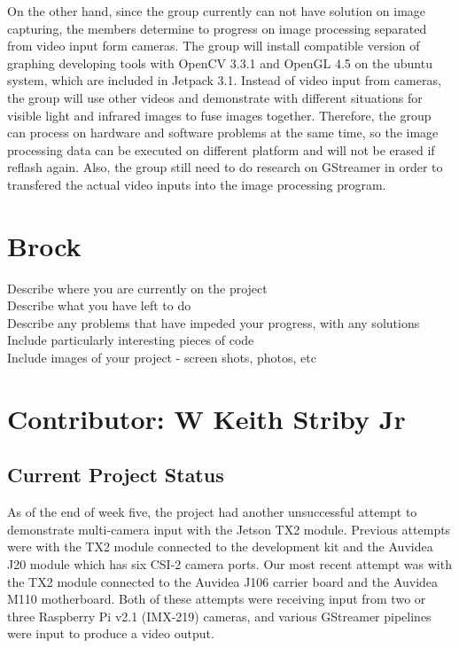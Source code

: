 \documentclass[letterpaper,10pt,serif,draftclsnofoot,onecolumn,compsoc,titlepage]{IEEEtran}
\begin{document}
 On the other hand, since the group currently can not have solution on image capturing, the members 
 determine to progress on image processing separated from video input form cameras. The group will 
 install compatible version of graphing developing tools with OpenCV 3.3.1 and OpenGL 4.5 on the ubuntu 
 system, which are included in Jetpack 3.1. Instead of video input from cameras, the group will use 
 other videos and demonstrate with different situations for visible light and infrared images to fuse 
 images together. Therefore, the group can process on hardware and software problems at the same time, 
 so the image processing data can be executed on different platform and will not be erased if reflash again. 
 Also, the group still need to do research on GStreamer in order to transfered the actual video inputs 
 into the image processing program.\\


\section{Brock}
Describe where you are currently on the project \\

Describe what you have left to do \\

Describe any problems that have impeded your progress, with any solutions \\

Include particularly interesting pieces of code \\

Include images of your project - screen shots, photos, etc \\


\section{Contributor: W Keith Striby Jr}

\subsection{Current Project Status}

As of the end of week five, the project had another unsuccessful attempt to demonstrate 
multi-camera input with the Jetson TX2 module. Previous attempts were with the TX2 module
connected to the development kit and the Auvidea J20 module which has six CSI-2 camera 
ports. Our most recent attempt was with the TX2 module connected to the Auvidea J106 
carrier board and the Auvidea M110 motherboard. Both of these attempts were receiving 
input from two or three Raspberry Pi v2.1 (IMX-219) cameras, and various GStreamer 
pipelines were input to produce a video output. \\
\end{document}

